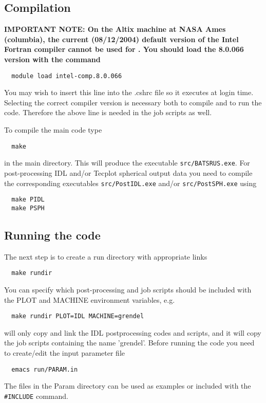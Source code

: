 \subsection{Compilation}

{\bf IMPORTANT NOTE:
On the Altix machine at NASA Ames (columbia),
the current (08/12/2004) 
default version of the Intel Fortran compiler 
cannot be used for \BATSRUS. 
You should load the 8.0.066 version with the command
\begin{verbatim}
  module load intel-comp.8.0.066
\end{verbatim}
You may wish to insert this line into the .cshrc file
so it executes at login time. 
Selecting the correct compiler version is 
necessary both to compile and to run the code.
Therefore the above line is needed in the job scripts
as well.}

To compile the main code type
\begin{verbatim}
  make
\end{verbatim}
in the main directory. This will produce the executable 
{\tt src/BATSRUS.exe}. For post-processing IDL and/or 
Tecplot spherical output data 
you need to compile the corresponding executables {\tt src/PostIDL.exe}
and/or {\tt src/PostSPH.exe} using
\begin{verbatim}
  make PIDL
  make PSPH
\end{verbatim}

\subsection{Running the code}

The next step is to create a run directory with appropriate links
\begin{verbatim}
  make rundir
\end{verbatim}
You can specify which post-processing and job scripts should be
included with the PLOT and MACHINE environment variables, e.g.
\begin{verbatim}
  make rundir PLOT=IDL MACHINE=grendel
\end{verbatim}
will only copy and link the IDL postprocessing codes and scripts,
and it will copy the job scripts containing the name 'grendel'.
Before running the code you need to create/edit the input
parameter file
\begin{verbatim}
  emacs run/PARAM.in
\end{verbatim}
The files in the Param directory can be used as examples or included
with the {\tt \#INCLUDE} command.

